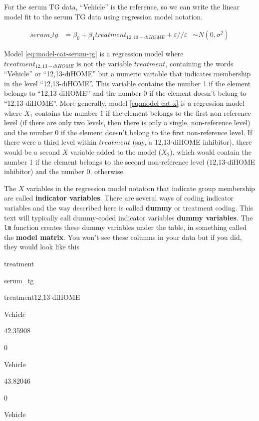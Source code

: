 \documentclass[]{book}
\begin{document}
For the serum TG data, ``Vehicle'' is the reference, so we can write the linear model fit to the serum TG data using regression model notation.

\begin{align}
serum\_tg &= \beta_0 + \beta_1 treatment_{12,13-diHOME} + \varepsilon//
\varepsilon &\sim N(0, \sigma^2)
\label{eq:model-cat-serum-tg}
\end{align}

Model \eqref{eq:model-cat-serum-tg} is a regression model where \(treatment_{12,13-diHOME}\) is not the variable \(treatment\), containing the words ``Vehicle'' or ``12,13-diHOME'' but a numeric variable that indicates membership in the level ``12,13-diHOME''. This variable contains the number 1 if the element belongs to ``12,13-diHOME'' and the number 0 if the element doesn't belong to ``12,13-diHOME''. More generally, model \eqref{eq:model-cat-x} is a regression model where \(X_1\) contains the number 1 if the element belongs to the first non-reference level (if there are only two levels, then there is only a single, non-reference level) and the number 0 if the element doesn't belong to the first non-reference level. If there were a third level within \(treatment\) (say, a 12,13-diHOME inhibitor), there would be a second \(X\) variable added to the model (\(X_2\)), which would contain the number 1 if the element belongs to the second non-reference level (12,13-diHOME inhibitor) and the number 0, otherwise.

The \(X\) variables in the regression model notation that indicate group membership are called \textbf{indicator variables}. There are several ways of coding indicator variables and the way described here is called \textbf{dummy} or treatment coding. This text will typically call dummy-coded indicator variables \textbf{dummy variables}. The \texttt{lm} function creates these dummy variables under the table, in something called the \textbf{model matrix}. You won't see these columns in your data but if you did, they would look like this

treatment

serum\_tg

treatment12,13-diHOME

Vehicle

42.35908

0

Vehicle

43.82046

0

Vehicle
\end{document}

